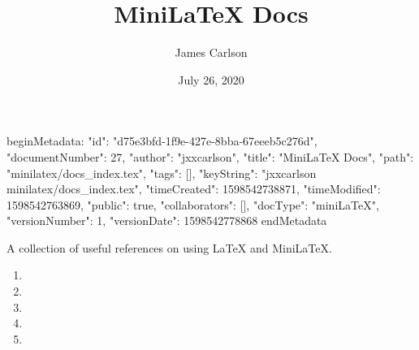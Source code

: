 beginMetadata:
{
    "id": "d75e3bfd-1f9e-427e-8bba-67eeeb5c276d",
    "documentNumber": 27,
    "author": "jxxcarlson",
    "title": "MiniLaTeX Docs",
    "path": "minilatex/docs_index.tex",
    "tags": [],
    "keyString": "jxxcarlson minilatex/docs_index.tex",
    "timeCreated": 1598542738871,
    "timeModified": 1598542763869,
    "public": true,
    "collaborators": [],
    "docType": "miniLaTeX",
    "versionNumber": 1,
    "versionDate": 1598542778868
}
endMetadata
\title{MiniLaTeX Docs}
\author{James Carlson}
\date{July 26, 2020}

\maketitle


A collection of useful references on using LaTeX and MiniLaTeX.

\begin{enumerate}

\item {}

\item {}

\item {}

\item {}

\item {}

\end{enumerate}
